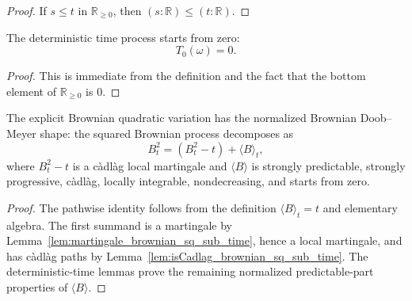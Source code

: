 \begin{proof}

\leanok
If \(s\le t\) in \(\mathbb R_{\ge 0}\), then \((s:\mathbb R)\le(t:\mathbb R)\).
\end{proof}

\begin{lemma}\label{lem:brownianDeterministicTime_bot_eq_zero}
  \leanok
The deterministic time process starts from zero:
\[
  T_0(\omega)=0.
\]
\end{lemma}

\begin{proof}

\leanok
This is immediate from the definition and the fact that the bottom element of
\(\mathbb R_{\ge 0}\) is \(0\).
\end{proof}

\begin{lemma}\label{lem:brownianQuadraticVariation_normalized_decomposition}
  \leanok
The explicit Brownian quadratic variation has the normalized Brownian
Doob--Meyer shape: the squared Brownian process decomposes as
\[
  B_t^2 = (B_t^2-t) + \langle B\rangle_t,
\]
where \(B_t^2-t\) is a càdlàg local martingale and
\(\langle B\rangle\) is strongly predictable, strongly progressive, càdlàg,
locally integrable, nondecreasing, and starts from zero.
\end{lemma}

\begin{proof}

\leanok
The pathwise identity follows from the definition
\(\langle B\rangle_t=t\) and elementary algebra.  The first summand is a
martingale by Lemma~\ref{lem:martingale_brownian_sq_sub_time}, hence a local
martingale, and has càdlàg paths by
Lemma~\ref{lem:isCadlag_brownian_sq_sub_time}.  The deterministic-time lemmas
prove the remaining normalized predictable-part properties of
\(\langle B\rangle\).
\end{proof}

